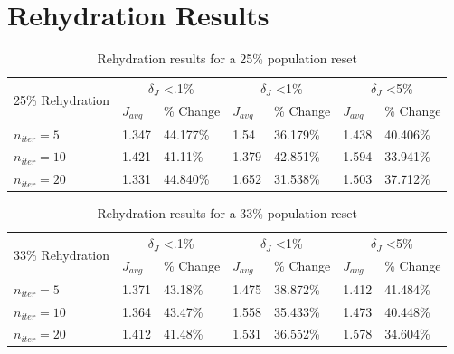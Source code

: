 \section{Rehydration Results }

\begin{table}[H]
  \centering
  \begin{tabular}{lll|ll|ll}
    \toprule
    \multirow{2}{*}{25\% Rehydration} &
      \multicolumn{2}{c}{$\delta_{J}$ \textless .1\%} &
      \multicolumn{2}{c}{$\delta_{J}$ \textless 1\%} &
      \multicolumn{2}{c}{$\delta_{J}$ \textless 5\%} \\
      \cmidrule{2-7}
    & $J_{avg}$ & \% Change & $J_{avg}$ & \% Change & $J_{avg}$ & \% Change \\
    \midrule

    $n_{iter}=5$ & 1.347 & 44.177\% & 1.54 & 36.179\% & 1.438 & 40.406\% \\
    $n_{iter}=10$ & 1.421 & 41.11\% & 1.379 & 42.851\% & 1.594 & 33.941\% \\
    $n_{iter}=20$ & 1.331 & 44.840\% & 1.652 & 31.538\% & 1.503 & 37.712\% \\
    \bottomrule
  \end{tabular}
  \caption{Rehydration results for a 25\% population reset}
  \label{tab:rehydation-p25}
\end{table}

\begin{table}[H]
  \centering
  \begin{tabular}{lll|ll|ll}
    \toprule
    \multirow{2}{*}{33\% Rehydration} &
      \multicolumn{2}{c}{$\delta_{J}$ \textless .1\%} &
      \multicolumn{2}{c}{$\delta_{J}$ \textless 1\%} &
      \multicolumn{2}{c}{$\delta_{J}$ \textless 5\%} \\
      \cmidrule{2-7}
    & $J_{avg}$ & \% Change & $J_{avg}$ & \% Change & $J_{avg}$ & \% Change \\
    \midrule

    $n_{iter}=5$ & 1.371 & 43.18\% & 1.475 & 38.872\% & 1.412 & 41.484\% \\
    $n_{iter}=10$ & 1.364 & 43.47\% & 1.558 & 35.433\% & 1.473 & 40.448\% \\
    $n_{iter}=20$ & 1.412 & 41.48\% & 1.531 & 36.552\% & 1.578 & 34.604\% \\
    \bottomrule
  \end{tabular}
  \caption{Rehydration results for a 33\% population reset}
  \label{tab:rehydation-p33}
\end{table}


